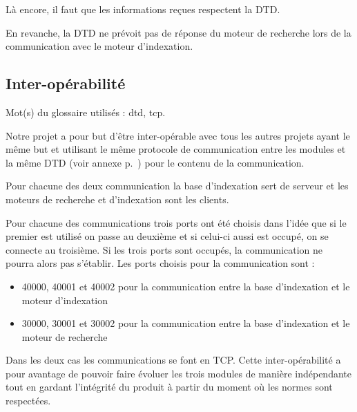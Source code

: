 Là encore, il faut que les informations reçues respectent la DTD.

En revanche, la DTD ne prévoit pas de réponse du moteur de recherche lors de la communication avec le moteur d'indexation.

\subsection{Inter-opérabilité}\label{inter_operabilite}
Mot(s) du glossaire utilisés : \gls{dtd}, \gls{tcp}.

Notre projet a pour but d'être inter-opérable avec tous les autres projets ayant le même but et utilisant le même protocole de communication entre les modules et la même DTD (voir annexe p.~\pageref{dtd}) pour le contenu de la communication.

Pour chacune des deux communication la base d'indexation sert de serveur et les moteurs de recherche et d'indexation sont les clients.

Pour chacune des communications trois ports ont été choisis dans l'idée que si le premier est utilisé on passe au deuxième et si celui-ci aussi est occupé, on se connecte au troisième. Si les trois ports sont occupés, la communication ne pourra alors pas s'établir. Les ports choisis pour la communication sont :
\begin{itemize}
\item 40000, 40001 et 40002 pour la communication entre la base d'indexation et le moteur d'indexation
\item 30000, 30001 et 30002 pour la communication entre la base d'indexation et le moteur de recherche
\end{itemize}
Dans les deux cas les communications se font en TCP.
Cette inter-opérabilité a pour avantage de pouvoir faire évoluer les trois modules de manière indépendante tout en gardant l'intégrité du produit à partir du moment où les normes sont respectées.